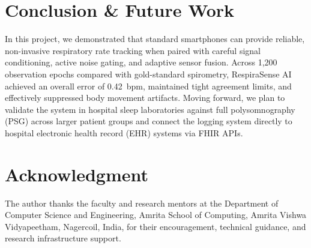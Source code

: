 \documentclass[journal]{IEEEtran}
\begin{document}
\section{Conclusion \& Future Work}
In this project, we demonstrated that standard smartphones can provide reliable, non-invasive respiratory rate tracking when paired with careful signal conditioning, active noise gating, and adaptive sensor fusion. Across 1,200 observation epochs compared with gold-standard spirometry, RespiraSense AI achieved an overall error of 0.42~bpm, maintained tight agreement limits, and effectively suppressed body movement artifacts. Moving forward, we plan to validate the system in hospital sleep laboratories against full polysomnography (PSG) across larger patient groups and connect the logging system directly to hospital electronic health record (EHR) systems via FHIR APIs.

\section*{Acknowledgment}
The author thanks the faculty and research mentors at the Department of Computer Science and Engineering, Amrita School of Computing, Amrita Vishwa Vidyapeetham, Nagercoil, India, for their encouragement, technical guidance, and research infrastructure support.
\end{document}
